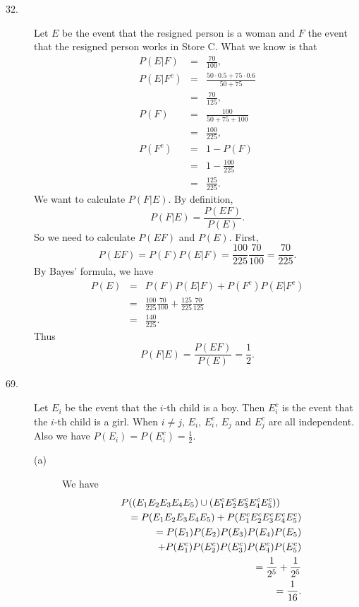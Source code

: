 \begin{description}

\item[{\rm 32.}] Let $E$ be the event that the resigned person is a
woman and $F$ the event that the resigned person works in Store C. 
What we know is that 
\begin{eqnarray*}
P(E|F)&=&\frac{70}{100},\\
P(E|F^{c})&=&\frac{50\cdot 0.5+75\cdot 0.6}{50+75}\\
&=&\frac{70}{125},\\
P(F)&=&\frac{100}{50+75+100}\\
&=&\frac{100}{225},\\
P(F^{c})&=&1-P(F)\\
&=&1-\frac{100}{225}\\
&=&\frac{125}{225}.
\end{eqnarray*}
We want to calculate $P(F|E)$. By definition, 
$$P(F|E)=\frac{P(EF)}{P(E)}.$$
So we need to calculate $P(EF)$ and $P(E)$. 
First, 
$$P(EF)=P(F)P(E|F)=\frac{100}{225}\frac{70}{100}=\frac{70}{225}.$$
By Bayes' formula, we have 
\begin{eqnarray*}
P(E)&=&P(F)P(E|F)+P(F^{c})P(E|F^{c})\\
&=&\frac{100}{225}\frac{70}{100}+\frac{125}{225}\frac{70}{125}\\
&=&\frac{140}{225}.
\end{eqnarray*}
Thus 
$$P(F|E)=\frac{P(EF)}{P(E)}=\frac{1}{2}.$$

\item[{\rm 69.}] Let $E_{i}$ be the event that the $i$-th child is 
a boy. Then $E_{i}^{c}$ is the event that the $i$-th child is 
a girl. When $i\ne j$, $E_{i}$, $E_{i}^{c}$, $E_{j}$ and $E^{c}_{j}$ are 
all independent. Also we have $P(E_{i})=P(E_{i}^{c})=\frac{1}{2}.$

\begin{description}

\item[(a)] We have 
\begin{eqnarray*}
\lefteqn{P((E_{1}E_{2}E_{3}E_{4}E_{5})\cup (E_{1}^{c}E_{2}^{c}
E_{3}^{c}E_{4}^{c}E_{5}^{c}))}\\
&&=P(E_{1}E_{2}E_{3}E_{4}E_{5})+P(E_{1}^{c}E_{2}^{c}
E_{3}^{c}E_{4}^{c}E_{5}^{c})\\
&&=P(E_{1})P(E_{2})P(E_{3})P(E_{4})P(E_{5})\\
&&\quad +P(E_{1}^{c})P(E_{2}^{c})
P(E_{3}^{c})P(E_{4}^{c})P(E_{5}^{c})\\
&&=\frac{1}{2^{5}}+\frac{1}{2^{5}}\\
&&=\frac{1}{16}.
\end{eqnarray*}


\end{description}
\end{description}
